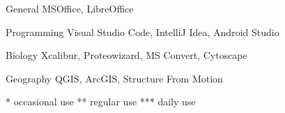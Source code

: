

\begin{cvpairs}

  
\cvpair
    {General} %
    {MSOffice, LibreOffice} %

  
\cvpair
    {Programming} %
    {Visual Studio Code, IntelliJ Idea, Android Studio} %

  
\cvpair
    {Biology} %
    {Xcalibur, Proteowizard, MS Convert, Cytoscape} %

  
\cvpair
    {Geography} %
    {QGIS, ArcGIS, Structure From Motion} %

\end{cvpairs}

{\color{teal}\footnotesize
* occasional use \quad
** regular use \quad
*** daily use
}